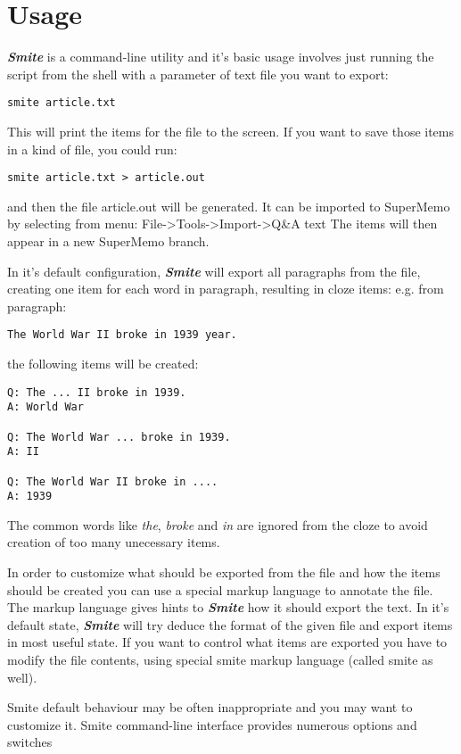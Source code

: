 \documentclass[a4paper,11pt]{article}
\newcommand{\smite}{\emph{\textbf{Smite{}}}}
\begin{document}
\section{Usage}

\smite{} is a command-line utility and it's basic usage involves just running the
script from the shell with a parameter of text file you want to export:
\begin{verbatim}
smite article.txt
\end{verbatim}

This will print the items for the file to the screen. If you want to save those
items in a kind of file, you could run:
\begin{verbatim}
smite article.txt > article.out
\end{verbatim}
and then the file article.out will be generated.
It can be imported to SuperMemo by selecting from menu:
File->Tools->Import->Q\&A text
The items will then appear in a new SuperMemo branch.


In it's default configuration, \smite{} will export all paragraphs from the
file, creating one item for each word in paragraph, resulting in cloze
items:
e.g. from paragraph:
\begin{verbatim}
The World War II broke in 1939 year.
\end{verbatim}
the following items will be created:

\begin{verbatim}
Q: The ... II broke in 1939.
A: World War

Q: The World War ... broke in 1939.
A: II

Q: The World War II broke in ....
A: 1939
\end{verbatim}

The common words like \textit{the}, \textit{broke} and \textit{in} are ignored
from the cloze to avoid creation of too many unecessary items.

In order to customize what should be exported from the file and how the
items should be created you can use a special markup language to annotate the
file.  The markup language gives hints to \smite{} how it should export the
text.
In it's default state, \smite{} will try deduce the format of the given file
and export items in most useful state. If you want to control what items are
exported you have to modify the file contents, using special smite markup
language (called smite as well).


Smite default behaviour may be often inappropriate and you may want to
customize it. Smite command-line interface provides numerous options and switches
\end{document}
